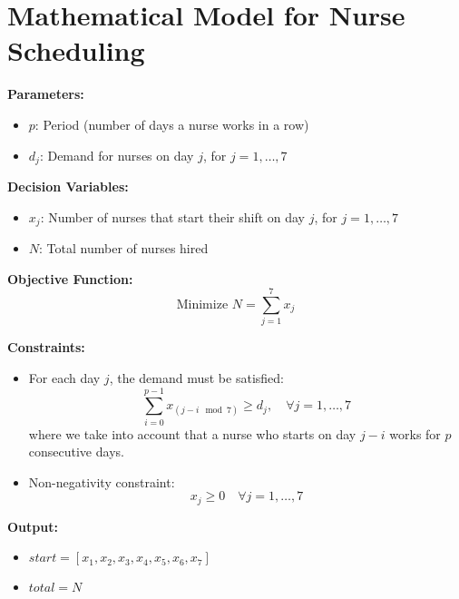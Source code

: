 \documentclass{article}
\begin{document}
\section*{Mathematical Model for Nurse Scheduling}

\textbf{Parameters:}
\begin{itemize}
    \item $p$: Period (number of days a nurse works in a row)
    \item $d_j$: Demand for nurses on day $j$, for $j = 1, \ldots, 7$
\end{itemize}

\textbf{Decision Variables:}
\begin{itemize}
    \item $x_j$: Number of nurses that start their shift on day $j$, for $j = 1, \ldots, 7$
    \item $N$: Total number of nurses hired
\end{itemize}

\textbf{Objective Function:}
\[
\text{Minimize } N = \sum_{j=1}^{7} x_j
\]

\textbf{Constraints:}
\begin{itemize}
    \item For each day $j$, the demand must be satisfied:
    \[
    \sum_{i=0}^{p-1} x_{(j-i \mod 7)} \geq d_j, \quad \forall j = 1, \ldots, 7
    \]
    where we take into account that a nurse who starts on day $j-i$ works for $p$ consecutive days.
    
    \item Non-negativity constraint:
    \[
    x_j \geq 0 \quad \forall j = 1, \ldots, 7
    \]
\end{itemize}

\textbf{Output:}
\begin{itemize}
    \item $start = [x_1, x_2, x_3, x_4, x_5, x_6, x_7]$
    \item $total = N$
\end{itemize}
\end{document}
